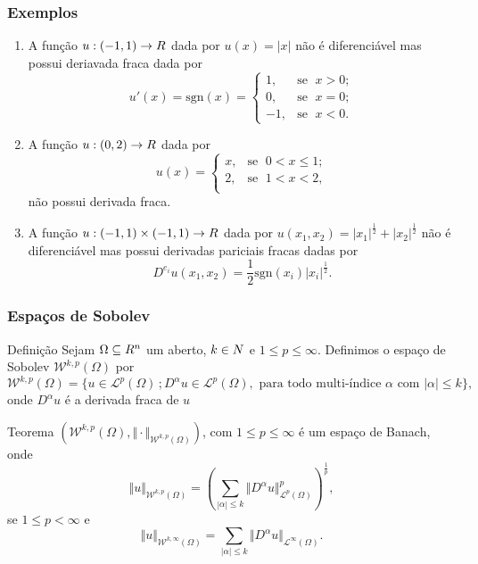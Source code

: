 \documentclass[xcolor=dvipsnames, aspectratio=169, 10pt]{beamer}
\let\mathbb\relax
\newcommand{\bN}{\mathbb{N}}
\newcommand{\bR}{\mathbb{R}}
\newcommand{\cL}{\mathcal{L}}
\newcommand{\cW}{\mathcal{W}}
\newcommand{\sgn}{\mathrm{sgn}}
\begin{document}
\begin{frame}
    \frametitle{Exemplos}
    \begin{enumerate}[label=\arabic*.]
        \item A função $u : (-1,1) \to \bR$ dada por $u(x) =|x|$ não é diferenciável mas possui deriavada fraca dada por
        \[
            u'(x) = \sgn(x) = \left\{ 
            \begin{array}{rr}
                1, &\!\text{se }\; x > 0;\\
                0, &\!\text{se }\; x = 0;\\
                -1,&\!\text{se }\; x < 0.
            \end{array}
        \right.
        \] \pause
        \item A função $u : (0,2) \to \bR$ dada por
        \[
        u(x) = \left\{
            \begin{array}{rl}
                x, & \!\text{se }\; 0 < x \leqslant 1;\\
                2, & \!\text{se }\; 1 < x < 2,\\
            \end{array}
        \right.
        \]
        não possui derivada fraca. \pause
        \item A função $u : (-1,1) \times (-1,1) \to \bR$ dada por $u(x_1,x_2) = |x_1|^{\frac{1}{2}} + |x_2|^{\frac{1}{2}}$ não é diferenciável mas possui derivadas pariciais fracas dadas por
        \[
            D^{e_i}u(x_1,x_2) = \frac{1}{2} \sgn(x_i) |x_i|^{\frac{1}{2}}.
        \]
    \end{enumerate}
\end{frame}
\begin{frame}
    \frametitle{Espaços de Sobolev}
    \begin{block}{Definição}
        Sejam $\Omega \subseteq \bR^n$ um aberto, $k \in \bN$ e $1 \leqslant p \leqslant \infty$. Definimos o espaço de Sobolev $\cW^{k,p}(\Omega)$ por
        \[
            \cW^{k,p}(\Omega) = \{u \in \cL^p(\Omega) \,; D^\alpha u \in \cL^p(\Omega), \text{ para todo multi-índice $\alpha$ com } |\alpha| \leqslant k\},
        \]
        onde $D^\alpha u$ é a derivada fraca de $u$
    \end{block} \pause
    \begin{block}{Teorema}
        $(\cW^{k,p}(\Omega), \Vert \cdot \Vert_{\cW^{k,p}(\Omega)})$, com $1 \leqslant p \leqslant \infty$ é um espaço de Banach, onde
        \[
            \Vert u \Vert_{\cW^{k,p}(\Omega)} = \left( \sum_{|\alpha| \leqslant k} \Vert D^\alpha u \Vert_{\cL^p(\Omega)}^p \right)^{\frac{1}{p}},
        \]
        se $1 \leqslant p < \infty$ e
        \[
            \Vert u \Vert_{\cW^{k,\infty}(\Omega)} = \sum_{|\alpha| \leqslant k} \Vert D^\alpha u  \Vert_{\cL^\infty(\Omega)}.
        \]
    \end{block}
\end{frame}
\end{document}
